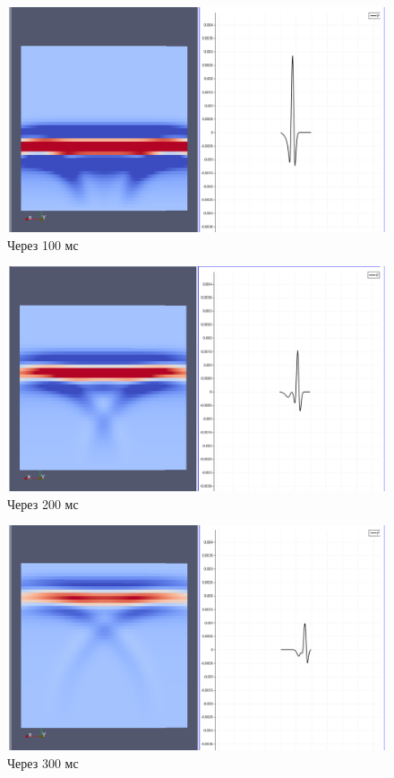 \documentclass{article}
\begin{document}
\begin{figure}[ht]
  \center
  \includegraphics[scale=0.2]{pic_kirchhoff_scalar/t1.png}
  \caption{Через 100 мс}
\label{img_snapshot_1}
\end{figure}
\begin{figure}[ht]
  \center
  \includegraphics[scale=0.2]{pic_kirchhoff_scalar/t2.png}
  \caption{Через 200 мс}
\label{img_snapshot_2}
\end{figure}
\begin{figure}[ht]
  \center
  \includegraphics[scale=0.2]{pic_kirchhoff_scalar/t3.png}
  \caption{Через 300 мс}
\label{img_snapshot_3}
\end{figure}
\end{document}
